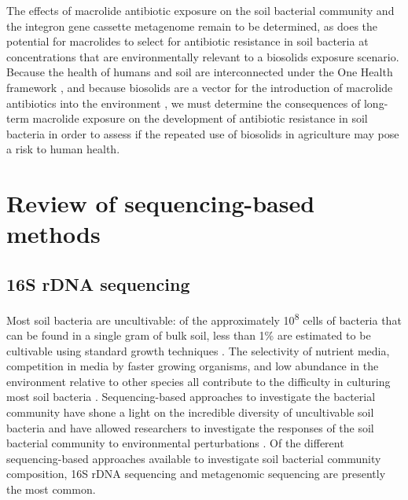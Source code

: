 The effects of macrolide antibiotic exposure on the soil bacterial community and the integron gene cassette metagenome remain to be determined, as does the potential for macrolides to select for antibiotic resistance in soil bacteria at concentrations that are environmentally relevant to a biosolids exposure scenario.
Because the health of humans and soil are interconnected under the One Health framework \parencite{Tiedje.2019}, and because biosolids are a vector for the introduction of macrolide antibiotics into the environment \parencite{Sabourin.2012, McClellan.2010}, we must determine the consequences of long-term macrolide exposure on the development of antibiotic resistance in soil bacteria in order to assess if the repeated use of biosolids in agriculture may pose a risk to human health.

\section{Review of sequencing-based methods}

\subsection{16S rDNA sequencing}

Most soil bacteria are uncultivable:
of the approximately 10\textsuperscript{8} cells of bacteria that can be found in a single gram of bulk soil, less than 1\% are estimated to be cultivable using standard growth techniques \parencite{Raynaud.2014, vanPham.2012}.
The selectivity of nutrient media, competition in media by faster growing organisms, and low abundance in the environment relative to other species all contribute to the difficulty in culturing most soil bacteria \parencite[229–300]{vanElsas.2019b}.
Sequencing-based approaches to investigate the bacterial community have shone a light on the incredible diversity of uncultivable soil bacteria \parencite{Hug.2016} and have allowed researchers to investigate the responses of the soil bacterial community to environmental perturbations \parencite{Isobe.2019, Isobe.2020}.
Of the different sequencing-based approaches available to investigate soil bacterial community composition, 16S rDNA sequencing and metagenomic sequencing are presently the most common.

